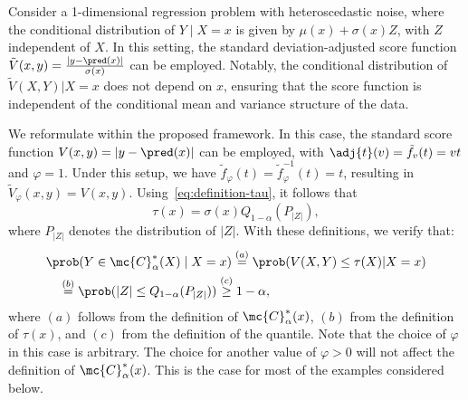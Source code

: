 
  \begin{example}
  \label{ex:running-example}
    Consider a 1-dimensional regression  problem with heteroscedastic noise, where the conditional distribution of \(Y \mid X = x\) is given by \(\mu(x) + \sigma(x) Z\), with \(Z\) independent of \(X\). In this setting, the standard deviation-adjusted score function \(\tilde{V}(x, y) = \frac{|y - \pred(x)|}{\sigma(x)}\) can be employed. Notably, the conditional distribution of \(\tilde{V}(X, Y) | X=x \) does not depend on $x$, ensuring that the score function is independent of the conditional mean and variance structure of the data.
  \end{example}

 \begin{example}[revisited]
    We reformulate  within the proposed framework. In this case, the standard score function \(V(x, y) = |y - \pred(x)|\) can be employed, with \(\adj{t}(v) = \tilde{f}_v(t) = vt\) and \(\varphi = 1\). Under this setup, we have \(\tilde{f}_\varphi(t) = \tilde{f}_\varphi^{-1}(t) = t\), resulting in \(\tilde{V}_\varphi(x, y) = V(x, y)\). Using~\eqref{eq:definition-tau}, it follows that 
    \[
      \tau(x) = \sigma(x) Q_{1-\alpha}(P_{|Z|}),
    \]
    where \(P_{|Z|}\) denotes the distribution of \(|Z|\).  With these definitions, we verify that:
    \begin{align*}
      &\prob(Y \in \mc{C}_{\alpha}^*(X) \mid X = x) \stackrel{(a)}{=} \prob(V(X, Y) \leq \tau(X) | X=x) \\
      &\quad \stackrel{(b)}{=} \prob(|Z| \leq Q_{1-\alpha}(P_{|Z|})) \stackrel{(c)}{\geq} 1-\alpha,
    \end{align*}
    where \((a)\) follows from the definition of \(\mc{C}_{\alpha}^*(x)\), \((b)\) from the definition of \(\tau(x)\), and \((c)\) from the definition of the quantile. Note that the choice of $\varphi$ in this case is arbitrary. The choice for another value of $\varphi > 0$ will not affect the definition of $\mc{C}_{\alpha}^*(x)$. This is the case for most of the examples considered below.
  \end{example}
  